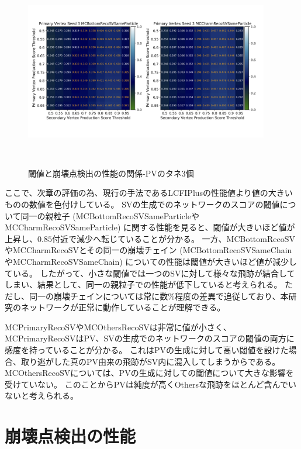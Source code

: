 \begin{figure}[htbp]
   \begin{minipage}{1.0\textwidth}
   \centering
    \includegraphics[trim = 0 140 0 140, width=0.95\textwidth, clip]{Figure/4VertexFinderwithDL/4-2-2-4TrackEfficiencySameParticle.png}
   \end{minipage} 
  \caption{閾値と崩壊点検出の性能の関係-PVのタネ3個}
  \label{4-2-2-4TrackEfficiency}
\end{figure}

ここで、次章の評価の為、現行の手法であるLCFIPlusの性能値より値の大きいものの数値を色付けしている。
SVの生成でのネットワークのスコアの閾値について同一の親粒子 (MCBottomRecoSVSameParticleやMCCharmRecoSVSameParticle) に関する性能を見ると、閾値が大きいほど値が上昇し、$0.85$付近で減少へ転じていることが分かる。
一方、MCBottomRecoSVやMCCharmRecoSVとその同一の崩壊チェイン (MCBottomRecoSVSameChainやMCCharmRecoSVSameChain) についての性能は閾値が大きいほど値が減少している。
したがって、小さな閾値では一つのSVに対して様々な飛跡が結合してしまい、結果として、同一の親粒子での性能が低下していると考えられる。
ただし、同一の崩壊チェインについては常に数\%程度の差異で追従しており、本研究のネットワークが正常に動作していることが理解できる。

MCPrimaryRecoSVやMCOthersRecoSVは非常に値が小さく、MCPrimaryRecoSVはPV、SVの生成でのネットワークのスコアの閾値の両方に感度を持っていることが分かる。
これはPVの生成に対して高い閾値を設けた場合、取り逃がした真のPV由来の飛跡がSV内に混入してしまうからである。
MCOthersRecoSVについては、PVの生成に対しての閾値について大きな影響を受けていない。
このことからPVは純度が高くOthersな飛跡をほとんど含んでいないと考えられる。


\section{崩壊点検出の性能} \label{VFDL:SummaryofVFDL}

